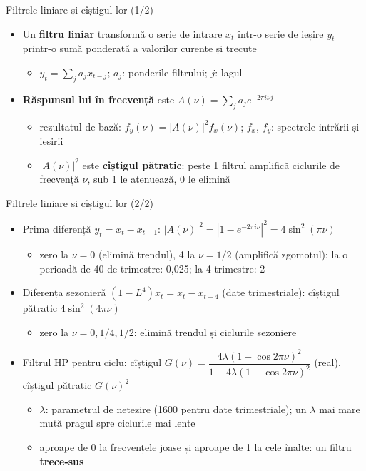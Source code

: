 \begin{frame}{Filtrele liniare și cîștigul lor (1/2)}
\itemsize{\small}
\begin{itemize}
    \item Un \textbf{filtru liniar} transformă o serie de intrare $x_t$ într-o serie de ieșire $y_t$ printr-o sumă ponderată a valorilor curente și trecute
    \begin{itemize}
        \item $y_t = \sum_j a_j x_{t-j}$; $a_j$: ponderile filtrului; $j$: lagul
    \end{itemize}
    \item \textbf{Răspunsul lui în frecvență} este $A(\nu) = \sum_j a_j e^{-2\pi i\nu j}$
    \begin{itemize}
        \item rezultatul de bază: $f_y(\nu) = |A(\nu)|^2 f_x(\nu)$; $f_x$, $f_y$: spectrele intrării și ieșirii
        \item $|A(\nu)|^2$ este \textbf{cîștigul pătratic}: peste 1 filtrul amplifică ciclurile de frecvență $\nu$, sub 1 le atenuează, 0 le elimină
    \end{itemize}
\end{itemize}
\end{frame}

\begin{frame}{Filtrele liniare și cîștigul lor (2/2)}
\itemsize{\small}
\begin{itemize}
    \item Prima diferență $y_t = x_t - x_{t-1}$: $|A(\nu)|^2 = |1 - e^{-2\pi i\nu}|^2 = 4\sin^2(\pi\nu)$
    \begin{itemize}
        \item zero la $\nu = 0$ (elimină trendul), 4 la $\nu = 1/2$ (amplifică zgomotul); la o perioadă de 40 de trimestre: 0{,}025; la 4 trimestre: 2
    \end{itemize}
    \item Diferența sezonieră $(1 - L^4)x_t = x_t - x_{t-4}$ (date trimestriale): cîștigul pătratic $4\sin^2(4\pi\nu)$
    \begin{itemize}
        \item zero la $\nu = 0, 1/4, 1/2$: elimină trendul și ciclurile sezoniere
    \end{itemize}
    \item Filtrul HP pentru ciclu: cîștigul $G(\nu) = \dfrac{4\lambda(1 - \cos 2\pi\nu)^2}{1 + 4\lambda(1 - \cos 2\pi\nu)^2}$ (real), cîștigul pătratic $G(\nu)^2$
    \begin{itemize}
        \item $\lambda$: parametrul de netezire (1600 pentru date trimestriale); un $\lambda$ mai mare mută pragul spre ciclurile mai lente
        \item aproape de 0 la frecvențele joase și aproape de 1 la cele înalte: un filtru \textbf{trece-sus}
    \end{itemize}
\end{itemize}
\end{frame}

